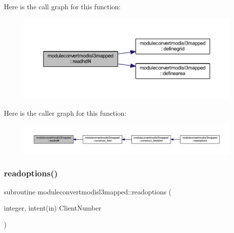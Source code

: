 Here is the call graph for this function\+:\nopagebreak
\begin{figure}[H]
\begin{center}
\leavevmode
\includegraphics[width=350pt]{namespacemoduleconvertmodisl3mapped_a848303d0a614c18b94629b24f417fee7_cgraph}
\end{center}
\end{figure}
Here is the caller graph for this function\+:\nopagebreak
\begin{figure}[H]
\begin{center}
\leavevmode
\includegraphics[width=350pt]{namespacemoduleconvertmodisl3mapped_a848303d0a614c18b94629b24f417fee7_icgraph}
\end{center}
\end{figure}
\mbox{\label{namespacemoduleconvertmodisl3mapped_a0f034c5b727c268c416d8c9dfec265e3}} 
\subsubsection{\texorpdfstring{readoptions()}{readoptions()}}
{\footnotesize\ttfamily subroutine moduleconvertmodisl3mapped\+::readoptions (\begin{DoxyParamCaption}\item[{integer, intent(in)}]{Client\+Number }\end{DoxyParamCaption})\hspace{0.3cm}{\ttfamily [private]}}

